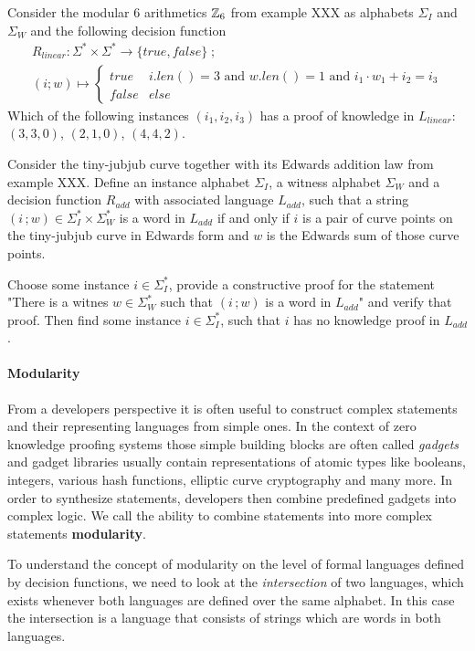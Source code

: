 \begin{exercise} Consider the modular $6$ arithmetics $\mathbb{Z}_6$ from example XXX as alphabets $\Sigma_I$ and $\Sigma_W$ and the following decision function
\begin{multline*}
R_{linear} : \Sigma^* \times \Sigma^* \to \{true, false\}\;;\;\\
(i;w) \mapsto
\begin{cases}
true & i.len()=3 \text{ and } w.len()=1 \text{ and } i_1\cdot w_1 + i_2 = i_3\\
false & else
\end{cases}
\end{multline*}
Which of the following instances $(i_1,i_2,i_3)$ has a proof of knowledge in $L_{linear}$: $(3,3,0)$, $(2,1,0)$, $(4,4,2)$.
\end{exercise}
\begin{exercise} Consider the tiny-jubjub curve together with its Edwards addition law from example XXX. Define an instance alphabet $\Sigma_I$, a witness alphabet $\Sigma_W$ and a decision function $R_{add}$ with associated language $L_{add}$, such that a string $(i\,;w)\in \Sigma_I^* \times \Sigma_W^*$ is a word in $L_{add}$ if and only if $i$ is a pair of curve points on the tiny-jubjub curve in Edwards form and $w$ is the Edwards sum of those curve points.

Choose some instance $i\in \Sigma_I^*$, provide a constructive proof for the statement "There is a witnes $w\in \Sigma_W^*$ such that $(i\,;w)$ is a word in $L_{add}$" and verify that proof. Then find some instance $i\in \Sigma_I^*$, such that $i$ has no knowledge proof in $L_{add}$.
\end{exercise}
\paragraph{Modularity} From a developers perspective it is often useful to construct complex statements and their representing languages from simple ones. In the context of zero knowledge proofing systems those simple building blocks are often called \textit{gadgets} and gadget libraries usually contain representations of atomic types like booleans, integers, various hash functions, elliptic curve cryptography and many more. In order to synthesize statements, developers then combine predefined gadgets into complex logic. We call the ability to combine statements into more complex statements \textbf{modularity}. 

To understand the concept of modularity on the level of formal languages defined by decision functions, we need to look at the \textit{intersection} of two languages, which exists whenever both languages are defined over the same alphabet. In this case the intersection is a language that consists of strings which are words in both languages. 

